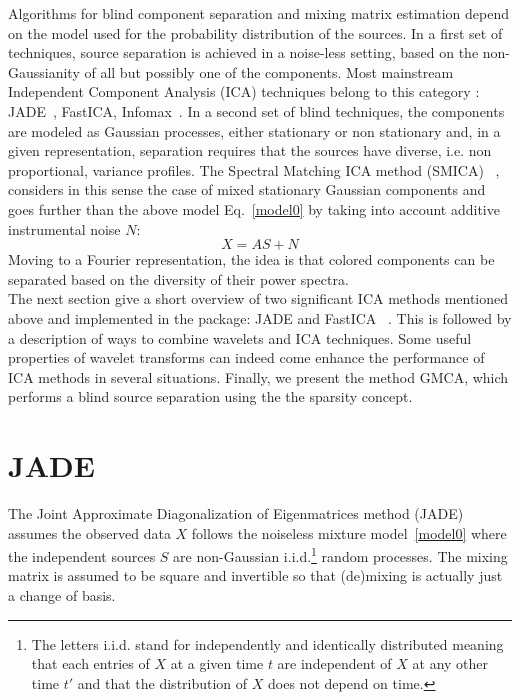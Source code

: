 Algorithms for blind component separation and mixing matrix estimation depend on the model used for the probability distribution 
of the sources. In a first set of techniques, source separation is achieved in a noise-less setting, based on the 
non-Gaussianity of all but possibly one of the components. Most mainstream Independent Component Analysis (ICA)  techniques belong to this category : JADE~\citep{ica:jade}, 
FastICA, Infomax~\citep{ica:icabook}. In a second set of blind techniques, the components are modeled as Gaussian processes, either 
stationary or non stationary and, in a given representation, separation requires that the sources have diverse, i.e. non 
proportional, variance profiles. The Spectral Matching ICA method (SMICA) ~\citep{ica:Del2003}, considers in this sense the case of 
mixed stationary Gaussian components and goes further than the above model Eq.~\eqref{model0} by taking into account additive 
instrumental noise $N$:
\begin{equation}\label{model1}
X = A S + N
\end{equation}
Moving to a Fourier representation, the idea is that colored components can be separated based on the diversity of their power spectra.\\ 
 
The next  section give a short overview of two significant ICA methods mentioned above and implemented in the \mrs package: 
JADE  and FastICA ~\citep{ica:icabook}. 
This is followed by a description of ways to 
combine wavelets and ICA techniques. Some useful properties of wavelet transforms can indeed come enhance the performance of ICA  methods in several situations. 
Finally, we present the method GMCA, which performs a blind source separation using the the sparsity concept.
    
\section{JADE}

The Joint Approximate Diagonalization of Eigenmatrices method (JADE) assumes the observed data $X$ follows the noiseless mixture 
model~\eqref{model0} where the independent sources $S$ are non-Gaussian i.i.d.\footnote{The letters i.i.d. stand for 
independently and identically distributed meaning that each entries of $X$ at a given time $t$ are independent of $X$ at any other 
time $t'$ and that the distribution of $X$ does not depend on time.} random processes. The mixing matrix is assumed to be square 
and invertible so that (de)mixing is actually just a change of basis.

